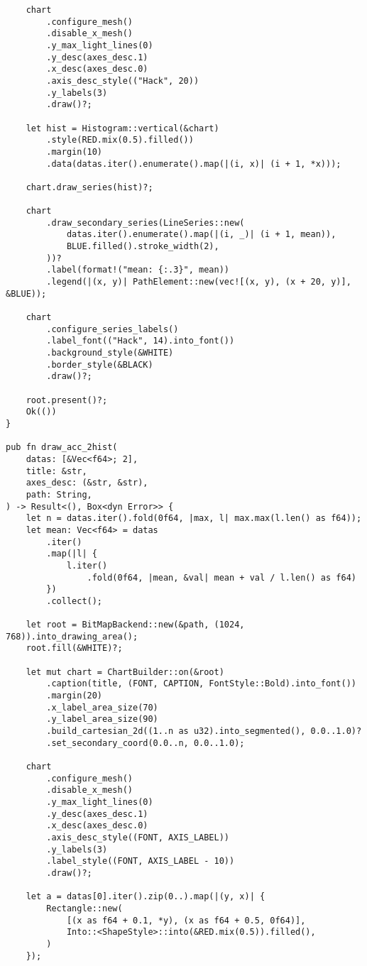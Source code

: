 \begin{code}
\begin{verbatim}
    chart
        .configure_mesh()
        .disable_x_mesh()
        .y_max_light_lines(0)
        .y_desc(axes_desc.1)
        .x_desc(axes_desc.0)
        .axis_desc_style(("Hack", 20))
        .y_labels(3)
        .draw()?;

    let hist = Histogram::vertical(&chart)
        .style(RED.mix(0.5).filled())
        .margin(10)
        .data(datas.iter().enumerate().map(|(i, x)| (i + 1, *x)));

    chart.draw_series(hist)?;

    chart
        .draw_secondary_series(LineSeries::new(
            datas.iter().enumerate().map(|(i, _)| (i + 1, mean)),
            BLUE.filled().stroke_width(2),
        ))?
        .label(format!("mean: {:.3}", mean))
        .legend(|(x, y)| PathElement::new(vec![(x, y), (x + 20, y)], &BLUE));

    chart
        .configure_series_labels()
        .label_font(("Hack", 14).into_font())
        .background_style(&WHITE)
        .border_style(&BLACK)
        .draw()?;

    root.present()?;
    Ok(())
}

pub fn draw_acc_2hist(
    datas: [&Vec<f64>; 2],
    title: &str,
    axes_desc: (&str, &str),
    path: String,
) -> Result<(), Box<dyn Error>> {
    let n = datas.iter().fold(0f64, |max, l| max.max(l.len() as f64));
    let mean: Vec<f64> = datas
        .iter()
        .map(|l| {
            l.iter()
                .fold(0f64, |mean, &val| mean + val / l.len() as f64)
        })
        .collect();

    let root = BitMapBackend::new(&path, (1024, 768)).into_drawing_area();
    root.fill(&WHITE)?;

    let mut chart = ChartBuilder::on(&root)
        .caption(title, (FONT, CAPTION, FontStyle::Bold).into_font())
        .margin(20)
        .x_label_area_size(70)
        .y_label_area_size(90)
        .build_cartesian_2d((1..n as u32).into_segmented(), 0.0..1.0)?
        .set_secondary_coord(0.0..n, 0.0..1.0);

    chart
        .configure_mesh()
        .disable_x_mesh()
        .y_max_light_lines(0)
        .y_desc(axes_desc.1)
        .x_desc(axes_desc.0)
        .axis_desc_style((FONT, AXIS_LABEL))
        .y_labels(3)
        .label_style((FONT, AXIS_LABEL - 10))
        .draw()?;

    let a = datas[0].iter().zip(0..).map(|(y, x)| {
        Rectangle::new(
            [(x as f64 + 0.1, *y), (x as f64 + 0.5, 0f64)],
            Into::<ShapeStyle>::into(&RED.mix(0.5)).filled(),
        )
    });


\end{verbatim}
\end{code}
